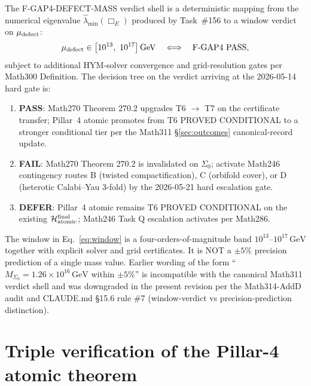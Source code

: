 The F-GAP4-DEFECT-MASS verdict shell is a deterministic mapping from
the numerical eigenvalue $\hat\lambda_{\min}(\Box_E)$ produced by
Task~\#156 to a window verdict on $\mu_{\rm defect}$:
\begin{equation}
\mu_{\rm defect} \in \big[10^{13},\ 10^{17}\big]\,\mathrm{GeV}
\quad \Longleftrightarrow \quad \text{F-GAP4 PASS},
\label{eq:window}
\end{equation}
subject to additional HYM-solver convergence and grid-resolution
gates per Math300 Definition. The decision tree on the verdict
arriving at the 2026-05-14 hard gate is:
\begin{enumerate}
\item \textbf{PASS}: Math270 Theorem 270.2 upgrades T6 $\to$ T7 on
the certificate transfer; Pillar~4 atomic promotes from
T6 PROVED CONDITIONAL to a stronger conditional tier per the
Math311 \S\ref{sec:outcomes} canonical-record update.
\item \textbf{FAIL}: Math270 Theorem 270.2 is invalidated on
$\Sigma_0$; activate Math246 contingency routes B (twisted
compactification), C (orbifold cover), or D (heterotic Calabi--Yau
3-fold) by the 2026-05-21 hard escalation gate.
\item \textbf{DEFER}: Pillar~4 atomic remains T6 PROVED CONDITIONAL
on the existing $\mathcal{H}_{\rm atomic}^{\rm final}$; Math246
Task Q escalation activates per Math286.
\end{enumerate}

\begin{remark}
\label{rem:window-vs-precision}
The window in Eq.~\eqref{eq:window} is a four-orders-of-magnitude
band $10^{13}\text{--}10^{17}\,\mathrm{GeV}$ together with explicit
solver and grid certificates. It is NOT a $\pm 5\%$ precision
prediction of a single mass value. Earlier wording of the form
``$M_{\Sigma_0} = 1.26 \times 10^{16}\,\mathrm{GeV}$ within
$\pm 5\%$'' is incompatible with the canonical Math311 verdict shell
and was downgraded in the present revision per the Math314-AddD
audit and CLAUDE.md \S15.6 rule \#7 (window-verdict vs
precision-prediction distinction).
\end{remark}

\section{Triple verification of the Pillar-4 atomic
theorem}\label{sec:verification}

